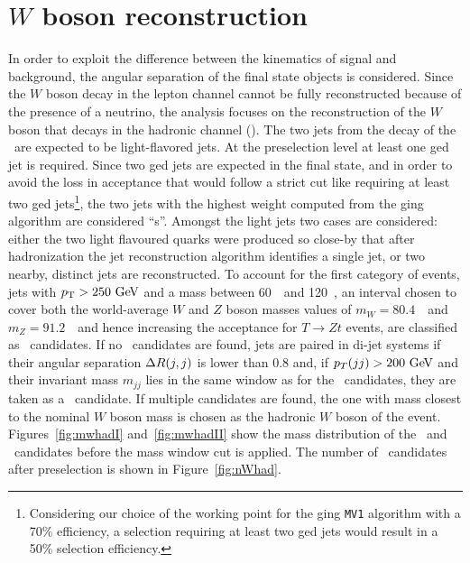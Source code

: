 \section{$W$ boson reconstruction}\label{sec:boostedW}

In order to exploit the difference between the kinematics
of signal and background, the angular separation of the final state
objects is considered. Since the $W$ boson decay
in the lepton channel cannot be fully reconstructed because of
the presence of a neutrino, the analysis
focuses on the reconstruction of the $W$ boson that decays in the hadronic
channel (\whad).
The two jets from the decay of the \whad\ are expected to be
light-flavored jets. At the preselection level at least
one \btag ged jet is required. Since two \btag ged jets are expected in
the final state, and in order to avoid the loss in acceptance that would follow a strict
cut like requiring at least two \btag ged jets\footnote{Considering our choice
of the working point for the \btag ging \texttt{MV1} algorithm with a 70\%
efficiency, a selection requiring at least two \btag ged jets would result
in a 50\% selection efficiency.}, the two jets with the 
highest weight computed from the \btag ging algorithm are considered ``\bjet s''.
Amongst the light jets two cases are considered: either the two light flavoured
quarks were produced so close-by that after hadronization the jet reconstruction
algorithm identifies a single jet, or two nearby, distinct jets are reconstructed.
To account for the first category of events, jets with $\pt>250\gev$ and a mass
between 60~\gev\ and 120~\gev, an interval chosen to cover both the world-average 
$W$ and $Z$ boson masses values of $m_W = 80.4$~\gev\ and $m_Z = 91.2$~\gev\ and
hence increasing the acceptance for $T\to Zt$ events, are 
classified as \wi\ candidates. If no \wi\ candidates are found, jets are paired
in di-jet systems if their angular separation $\dr(j,j)$ is lower than 0.8 and, if
$p_T(jj)>200\gev$ and 
their invariant mass $m_{jj}$ lies in the same window as for the \wi\ candidates, they 
are taken as a \wii\ candidate.
If multiple candidates are found, the one with mass closest 
to the nominal $W$ boson mass is chosen as the hadronic $W$ boson
of the event. 
Figures~\ref{fig:mwhadI} and~\ref{fig:mwhadII} show the mass distribution
of the \wi\ and \wii\ candidates before the mass window cut is applied. The
number of \whad\ candidates after preselection is shown in
Figure~\ref{fig:nWhad}. 

